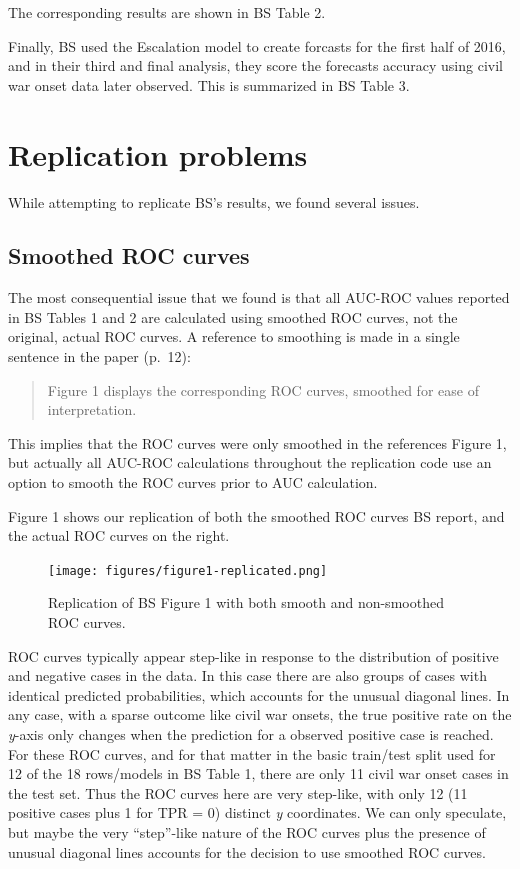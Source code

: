 \documentclass[]{article}
\begin{document}
The corresponding results are shown in BS Table 2.

Finally, BS used the Escalation model to create forcasts for the first
half of 2016, and in their third and final analysis, they score the
forecasts accuracy using civil war onset data later observed. This is
summarized in BS Table 3.

\hypertarget{replication-problems}{%
\section{Replication problems}\label{replication-problems}}

While attempting to replicate BS's results, we found several issues.

\hypertarget{smoothed-roc-curves}{%
\subsection{Smoothed ROC curves}\label{smoothed-roc-curves}}

The most consequential issue that we found is that all AUC-ROC values
reported in BS Tables 1 and 2 are calculated using smoothed ROC curves,
not the original, actual ROC curves. A reference to smoothing is made in
a single sentence in the paper (p.~12):

\begin{quote}
Figure 1 displays the corresponding ROC curves, smoothed for ease of
interpretation.
\end{quote}

This implies that the ROC curves were only smoothed in the references
Figure 1, but actually all AUC-ROC calculations throughout the
replication code use an option to smooth the ROC curves prior to AUC
calculation.

Figure 1 shows our replication of both the smoothed ROC curves BS
report, and the actual ROC curves on the right.

\begin{figure}
\centering
\texttt{[image: figures/figure1-replicated.png]}
\caption{Replication of BS Figure 1 with both smooth and non-smoothed
ROC curves.}
\end{figure}

ROC curves typically appear step-like in response to the distribution of
positive and negative cases in the data. In this case there are also
groups of cases with identical predicted probabilities, which accounts
for the unusual diagonal lines. In any case, with a sparse outcome like
civil war onsets, the true positive rate on the \emph{y}-axis only
changes when the prediction for a observed positive case is reached. For
these ROC curves, and for that matter in the basic train/test split used
for 12 of the 18 rows/models in BS Table 1, there are only 11 civil war
onset cases in the test set. Thus the ROC curves here are very
step-like, with only 12 (11 positive cases plus 1 for TPR = 0) distinct
\emph{y} coordinates. We can only speculate, but maybe the very
``step''-like nature of the ROC curves plus the presence of unusual
diagonal lines accounts for the decision to use smoothed ROC curves.
\end{document}
